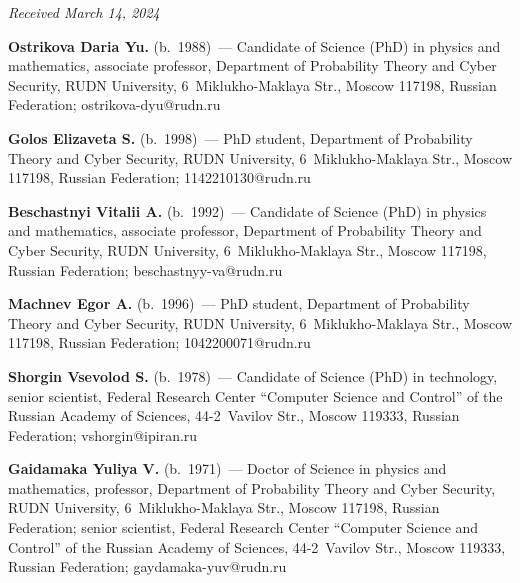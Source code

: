 \hfill{\small\textit{Received March 14, 2024}} 


\vspace*{-12pt}


\Contr

\vspace*{-3pt}

\noindent
\textbf{Ostrikova Daria Yu.} (b.\ 1988)~--- Candidate of Science (PhD) in physics and mathematics, 
associate professor, Department of Probability Theory and Cyber Security, RUDN University, 
6~Miklukho-Maklaya Str., Moscow 117198, Russian Federation; \mbox{ostrikova-dyu@rudn.ru}

\vspace*{3pt}


\noindent
\textbf{Golos Elizaveta S.} (b.\ 1998)~--- PhD student, Department of Probability Theory and Cyber 
Security, RUDN University, 6~Miklukho-Maklaya Str., Moscow 117198, Russian Federation; 
\mbox{1142210130@rudn.ru}


\pagebreak

\noindent
\textbf{Beschastnyi Vitalii A.} (b.\ 1992)~--- Candidate of Science (PhD) in physics and mathematics, 
associate professor, Department of Probability Theory and Cyber Security, RUDN University,  
6~Miklukho-Maklaya Str., Moscow  117198, Russian Federation; \mbox{beschastnyy-va@rudn.ru}

\vspace*{3pt}

\noindent
\textbf{Machnev Egor A.} (b.\ 1996)~--- PhD student, Department of Probability Theory and Cyber 
Security, RUDN University, 6~Miklukho-Maklaya Str., Moscow 117198, Russian Federation; 
\mbox{1042200071@rudn.ru}

\vspace*{3pt}

\noindent
\textbf{Shorgin Vsevolod S.} (b.\ 1978)~--- Candidate of Science (PhD) in technology, senior 
scientist, Federal Research Center ``Computer Science and Control'' of the Russian Academy of 
Sciences, 44-2~Vavilov Str., Moscow 119333, Russian Federation; \mbox{vshorgin@ipiran.ru}

\vspace*{3pt}

\noindent
\textbf{Gaidamaka Yuliya V.} (b.\ 1971)~--- Doctor of Science in physics and mathematics, professor, 
Department of Probability Theory and Cyber Security, RUDN University, 6~Miklukho-Maklaya Str., 
Moscow 117198, Russian Federation; senior scientist, Federal Research Center ``Computer Science 
and Control'' of the Russian Academy of Sciences, 44-2~Vavilov Str., Moscow 119333, Russian 
Federation; \mbox{gaydamaka-yuv@rudn.ru}





\label{end\stat}

\renewcommand{\bibname}{\protect\rm Литература} 